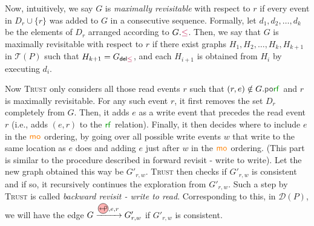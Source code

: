 \documentclass[acmsmall]{acmart}
\def\MO#1{{\textcolor{orange}{\textbf{MO:} #1}}}
\renewcommand{\MO}[1]{}
\newcommand{\trust}{\textsc{Trust}\xspace}
\newcommand{\rf}[1]{{\textcolor{green!60!black}{\mathsf{rf}}_{#1}}}
\newcommand{\mo}[1]{{\textcolor{orange}{\mathsf{mo}}_{#1}}}
\newcommand{\porf}[1]{\textcolor{darkgray}{\mathsf{po}\textcolor{green!60!black}{\mathsf{rf}}}_{#1}}
\newcommand{\inord}{\textcolor{purple}\leq}
\newcommand{\bwdtikz}{%
  \tikz[baseline=(char.base)]{
    \node[shape=circle, draw, fill=red!30, inner sep=0.15pt] (char) {$\looparrowleft$};
  }
}
\begin{document}
Now, intuitively, we say $G$ is \emph{maximally revisitable} with respect to $r$ if every event in 
$D_r \cup \{r\}$ was added to $G$ in a consecutive sequence. Formally, let $d_1,d_2,\dots,d_k$ be the elements of $D_r$ arranged according to $G.\inord$. Then, we say that $G$ is maximally revisitable with respect to $r$ if there exist graphs $H_1,H_2,\dots,H_k,H_{k+1}$ in $\mathcal{T}(P)$ 
such that $H_{k+1} = G_{\textsf{del} \inord}$, and each $H_{i+1}$ is obtained from $H_i$ by executing $d_i$.




Now \trust only considers all those read events $r$ such that $(r,e) \notin G.\porf{}$ and $r$ is maximally revisitable. For any such event $r$, it first removes the set $D_r$ completely from $G$.
Then, it adds $e$ as a write event that precedes the read event $r$ (i.e., adds $(e,r)$ to the $\rf{}$ relation). Finally, it then decides where to include $e$ in the $\mo{}$ ordering, by going over all possible write events $w$ that write to the same location as $e$ does and adding $e$ just after $w$ in the $\mo{}$ ordering. (This part is similar to the procedure described in forward revisit - write to write). Let the new graph obtained this way be $G'_{r,w}$. \trust then checks if $G'_{r,w}$ is consistent and if so, it recursively continues the exploration from $G'_{r,w}$.  Such a step by \trust is called \emph{backward revisit - write to read}. Corresponding to this, in $\mathcal{D}(P)$, we will have the edge $G \xrightarrow{\bwdtikz, e, r} G'_{r,w}$ if $G'_{r,w}$ is consistent.
\end{document}
